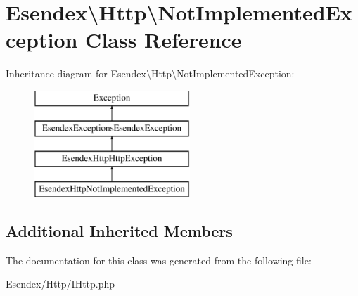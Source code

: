 \section{Esendex\textbackslash{}Http\textbackslash{}Not\-Implemented\-Exception Class Reference}
\label{class_esendex_1_1_http_1_1_not_implemented_exception}
Inheritance diagram for Esendex\textbackslash{}Http\textbackslash{}Not\-Implemented\-Exception\-:\begin{figure}[H]
\begin{center}
\leavevmode
\includegraphics[height=4.000000cm]{class_esendex_1_1_http_1_1_not_implemented_exception}
\end{center}
\end{figure}
\subsection*{Additional Inherited Members}


The documentation for this class was generated from the following file\-:\begin{DoxyCompactItemize}
\item 
Esendex/\-Http/I\-Http.\-php\end{DoxyCompactItemize}
